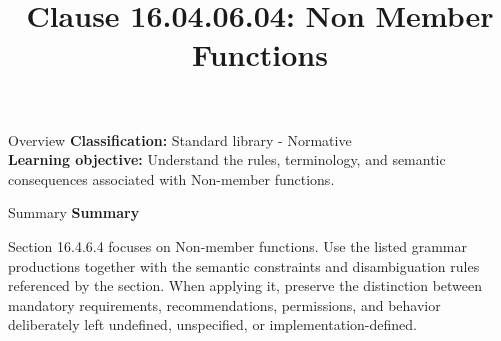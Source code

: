 \documentclass[10pt,letterpaper]{article}
\title{Clause 16.04.06.04: Non Member Functions}
\author{}
\date{}
\begin{document}
\maketitle
\begin{CornellOverviewBox}{Overview}
\textbf{Classification:} Standard library - Normative\\[2pt]
\textbf{Learning objective:} Understand the rules, terminology, and semantic consequences associated with Non-member functions.
\end{CornellOverviewBox}\begin{CornellSummaryBox}{Summary}
{\sffamily\bfseries\color{Accent} Summary}\par\vspace{3pt}Section 16.4.6.4 focuses on Non-member functions. Use the listed grammar productions together with the semantic constraints and disambiguation rules referenced by the section. When applying it, preserve the distinction between mandatory requirements, recommendations, permissions, and behavior deliberately left undefined, unspecified, or implementation-defined.
\end{CornellSummaryBox}
\end{document}
